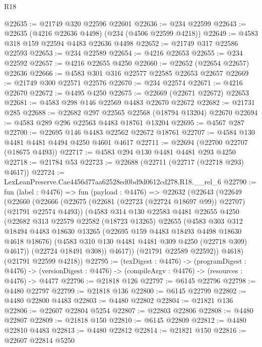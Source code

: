 \begin{lexlean}{R18}
\begin{coremodule}
@22635 := @21749 @320 @22596 @22601
@22636 := @234 @22599
@22643 := @22635 (@4216 @22636 @4498) (@234 (@4506 @22599 @4218))
@22649 := @4583 @318 @159 @22594 @4483 @22636 @4498
@22652 := @21749 @317 @22586 @22593
@22653 := @234 @22589
@22654 := @4216 @22653
@22655 := @234 @22592
@22657 := @4216 @22655 @4250
@22660 := @22652 (@22654 @22657) @22636
@22666 := @4583 @301 @316 @22577 @22585 @22653 @22657
@22669 := @21749 @300 @22571 @22576
@22670 := @234 @22574
@22671 := @4216 @22670
@22672 := @4495 @4250
@22675 := @22669 (@22671 @22672) @22653
@22681 := @4583 @298 @146 @22569 @4483 @22670 @22672
@22682 := @21731 @285
@22688 := @22682 @297 @22565 @22568 (@18794 @13204) @22670
@22694 := @4583 @289 @296 @22563 @4483 @18761 @13204
@22695 := @4567 @287
@22700 := @22695 @146 @4483 @22562 @22672 @18761
@22707 := @4584 @130 @4481 @4481 @4494 @4250 @4601 @4617
@22711 := @22694 (@22700 @22707 (@18675 @4493))
@22717 := @4583 @294 @130 @4481 @4481 @293 @4250
@22718 := @21784 @53
@22723 := @22688 (@22711 (@22717 (@22718 @293) @4617))
@22724 := LexLeanPreserve.Cae4456d77aa62528ed0bd9d0612cd278.R18.__rel_6
@22790 := fun (label : @4476) =>
  fun (payload : @4476) =>
  @22632
    (@22643
      (@22649
        (@22660
          (@22666
            (@22675 (@22681 (@22723 (@22724 @18697 @99)) @22707) (@21791 @22574 @4493))
            (@4583
              @314
              @130
              @22583
              @4481
              @22655
              @4250
              (@22682
                @313
                @22579
                @22582
                (@18723 @13265)
                @22655
                (@4583
                  @303
                  @312
                  @18494
                  @4483
                  @18630
                  @13265
                  (@22695 @159 @4483 @18493 @4498 @18630 @4618 @18676)
                  (@4583 @310 @130 @4481 @4481 @309 @4250 (@22718 @309) @4617))
                (@22724 @18491 @308))
              @4617))
          (@21791 @22589 @22592))
        @4618)
      (@21791 @22599 @4218))
@22795 := (texDigest : @4476) ->
  (programDigest : @4476) ->
  (versionDigest : @4476) -> (compileArgv : @4476) -> (resources : @4476) -> @4477
@22796 := @21818 @126
@22797 := @6145 @22796
@22798 := @4480 @22797
@22799 := @21818 @136
@22800 := @6145 @22799
@22802 := @4480 @22800 @4483
@22803 := @4480 @22802
@22804 := @21821 @136
@22806 := @22607 @22804 @5254
@22807 := @22803 @22806
@22808 := @4480 @22807
@22809 := @21818 @150
@22810 := @6145 @22809
@22812 := @4480 @22810 @4483
@22813 := @4480 @22812
@22814 := @21821 @150
@22816 := @22607 @22814 @5250

\end{coremodule}
\end{lexlean}

